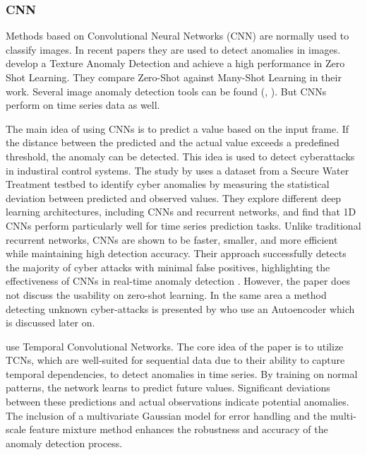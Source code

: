 \subsubsection{CNN}
Methods based on Convolutional Neural Networks (CNN) are normally used to classify images. In recent papers they are used to detect anomalies in images.  develop a Texture Anomaly Detection and achieve a high performance in Zero Shot Learning. They compare Zero-Shot against Many-Shot Learning in their work. Several image anomaly detection tools can be found (, ). But CNNs perform on time series data as well.

The main idea of using CNNs is to predict a value based on the input frame. If the distance between the predicted and the actual value exceeds a predefined threshold, the anomaly can be detected.
This idea is used to detect cyberattacks in industiral control systems. The study by  uses a dataset from a Secure Water Treatment testbed to identify cyber anomalies by measuring the statistical deviation between predicted and observed values. They explore different deep learning architectures, including CNNs and recurrent networks, and find that 1D CNNs perform particularly well for time series prediction tasks. Unlike traditional recurrent networks, CNNs are shown to be faster, smaller, and more efficient while maintaining high detection accuracy. Their approach successfully detects the majority of cyber attacks with minimal false positives, highlighting the effectiveness of CNNs in real-time anomaly detection . However, the paper does not discuss the usability on zero-shot learning. In the same area a method detecting unknown cyber-attacks is presented by  who use an Autoencoder which is discussed later on.

 use Temporal Convolutional Networks. The core idea of the paper is to utilize TCNs, which are well-suited for sequential data due to their ability to capture temporal dependencies, to detect anomalies in time series. By training on normal patterns, the network learns to predict future values. Significant deviations between these predictions and actual observations indicate potential anomalies. The inclusion of a multivariate Gaussian model for error handling and the multi-scale feature mixture method enhances the robustness and accuracy of the anomaly detection process.

